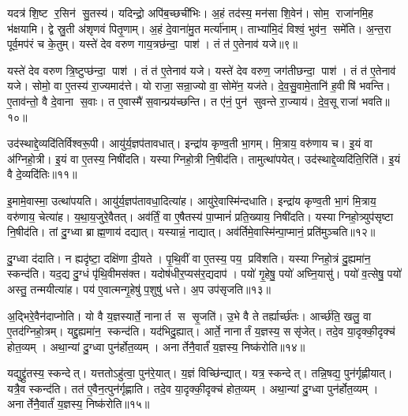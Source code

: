 यदत्र॑ शि॒ष्ट र॒सिन॑ सु॒तस्य॑।
यदिन्द्रो॒ अपि॑ब॒च्छची॑भिः।
अ॒हं तद॑स्य॒ मन॑सा शि॒वेन॑।
सोम॒ राजा॑नमि॒ह भ॑क्षयामि।
द्वे स्रु॒ती अ॑शृणवं पितृ॒णाम्।
अ॒हं दे॒वाना॑मु॒त मर्त्या॑नाम्।
ताभ्या॑मि॒दं विश्वं॒ भुव॑न॒ समे॑ति।
अ॒न्त॒रा पूर्व॒मप॑रं च के॒तुम्।
यस्ते॑ देव वरुण गाय॒त्रछ॑न्दा॒ पाश॑।
तं त॑ ए॒तेनाव॑ यजे॥९॥

यस्ते॑ देव वरुण त्रि॒ष्टुप्छ॑न्दा॒ पाश॑।
तं त॑ ए॒तेनाव॑ यजे।
यस्ते॑ देव वरुण॒ जग॑तीछन्दा॒ पाश॑।
तं त॑ ए॒तेनाव॑ यजे।
सोमो॒ वा ए॒तस्य॑ रा॒ज्यमाद॑त्ते।
यो राजा॒ सन्रा॒ज्यो वा॒ सोमे॑न॒ यज॑ते।
दे॒व॒सु॒वामे॒तानि॑ ह॒वीषि॑ भवन्ति।
ए॒ताव॑न्तो॒ वै दे॒वाना स॒वाः।
त ए॒वास्मै॑ स॒वान्प्रय॑च्छन्ति।
त ए॑नं॒ पुन॑ सुवन्ते रा॒ज्याय॑।
दे॒व॒सू राजा॑ भवति॥१०॥\anuvakamend[सोम॑ आवि॒शन् य॑जे रा॒ज्यायैकं॑ च]

उद॑स्थाद्दे॒व्यदि॑तिर्विश्वरू॒पी।
आयु॑र्य॒ज्ञप॑तावधात्।
इन्द्रा॑य कृण्व॒ती भा॒गम्।
मि॒त्राय॒ वरु॑णाय च।
इ॒यं वा अ॑ग्निहो॒त्री।
इ॒यं वा ए॒तस्य॒ निषी॑दति।
यस्याग्निहो॒त्री नि॒षीद॑ति।
तामुत्था॑पयेत्।
उद॑स्थाद्दे॒व्यदि॑ति॒रिति॑।
इ॒यं वै दे॒व्यदि॑तिः॥११॥

इ॒मामे॒वास्मा॒ उत्था॑पयति।
आयु॑र्य॒ज्ञप॑तावधा॒दित्या॑ह।
आयु॑रे॒वास्मि॑न्दधाति।
इन्द्रा॑य कृण्व॒ती भा॒गं मि॒त्राय॒ वरु॑णाय॒ चेत्या॑ह।
य॒था॒य॒जुरे॒वैतत्।
अव॑र्तिं॒ वा ए॒षैतस्य॑ पा॒प्मानं॑ प्रति॒ख्याय॒ निषी॑दति।
यस्याग्निहो॒त्र्युप॑सृष्टा नि॒षीद॑ति।
तां दु॒ग्ध्वा ब्राह्म॒णाय॑ दद्यात्।
यस्यान्नं॒ नाद्यात्।
अव॑र्तिमे॒वास्मि॑न्पा॒प्मानं॒ प्रति॑मुञ्चति॥१२॥

दु॒ग्ध्वा द॑दाति।
न ह्यदृ॑ष्टा॒ दक्षि॑णा दी॒यते।
पृ॒थि॒वीं वा ए॒तस्य॒ पय॒ प्रवि॑शति।
यस्याग्निहो॒त्रं दु॒ह्यमा॑न॒ स्कन्द॑ति।
यद॒द्य दु॒ग्धं पृ॑थि॒वीमस॑क्त।
यदोष॑धीर॒प्यस॑र॒द्यदाप॑।
पयो॑ गृ॒हेषु॒ पयो॑ अघ्नि॒यासु॑।
पयो॑ व॒त्सेषु॒ पयो॑ अस्तु॒ तन्मयीत्या॑ह।
पय॑ ए॒वात्मन्गृ॒हेषु॑ प॒शुषु॑ धत्ते।
अ॒प उप॑सृजति॥१३॥

अ॒द्भिरे॒वैन॑दाप्नोति।
यो वै य॒ज्ञस्यार्ते॒ नानार्त स सृ॒जति॑।
उ॒भे वै ते तर्ह्यार्च्छ॑तः।
आर्च्छ॑ति॒ खलु॒ वा ए॒तद॑ग्निहो॒त्रम्।
यद्दु॒ह्यमा॑न॒ स्कन्द॑ति।
यद॑भिदु॒ह्यात्।
आर्ते॒ नानार्तं य॒ज्ञस्य॒ ससृ॑जेत्।
तदे॒व या॒दृक्की॒दृक्च॑ होत॒व्यम्।
अथा॒न्यां दु॒ग्ध्वा पुन॑र्\mbox{}होत॒व्यम्।
अनार्तेनै॒वार्तं॑ य॒ज्ञस्य॒ निष्क॑रोति॥१४॥

यद्युद्द्रु॑तस्य॒ स्कन्देत्।
यत्ततोऽहु॑त्वा॒ पुन॑रे॒यात्।
य॒ज्ञं विच्छि॑न्द्यात्।
यत्र॒ स्कन्देत्।
तन्नि॒षद्य॒ पुन॑र्गृह्णीयात्।
यत्रै॒व स्कन्द॑ति।
तत॑ ए॒वैन॒त्पुन॑र्गृह्णाति।
तदे॒व या॒दृक्की॒दृक्च॑ होत॒व्यम्।
अथा॒न्यां दु॒ग्ध्वा पुन॑र्\mbox{}होत॒व्यम्।
अनार्तेनै॒वार्तं॑ य॒ज्ञस्य॒ निष्क॑रोति॥१५॥

